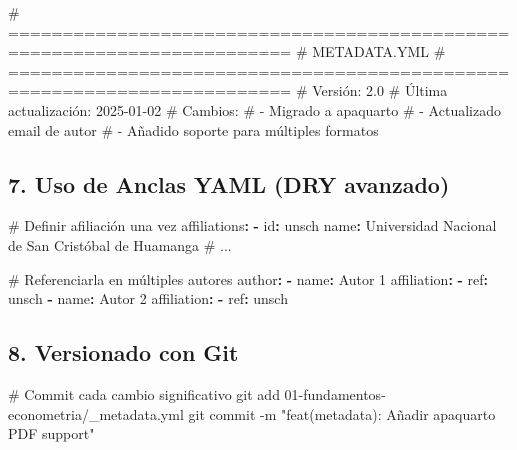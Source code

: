\documentclass[
  doc,
  floatsintext,
  longtable,
  a4paper,
  nolmodern,
  notxfonts,
  notimes,
  12pt,
  colorlinks=true,linkcolor=blue,citecolor=blue,urlcolor=blue]{apa7}
\newenvironment{Shaded}{\begin{snugshade}}{\end{snugshade}}
\newcommand{\AttributeTok}[1]{\textcolor[rgb]{0.40,0.45,0.13}{#1}}
\newcommand{\CommentTok}[1]{\textcolor[rgb]{0.37,0.37,0.37}{#1}}
\newcommand{\FunctionTok}[1]{\textcolor[rgb]{0.28,0.35,0.67}{#1}}
\newcommand{\KeywordTok}[1]{\textcolor[rgb]{0.00,0.23,0.31}{\textbf{#1}}}
\newcommand{\NormalTok}[1]{\textcolor[rgb]{0.00,0.23,0.31}{#1}}
\newcommand{\StringTok}[1]{\textcolor[rgb]{0.13,0.47,0.30}{#1}}
\begin{document}
\begin{Shaded}
\begin{Highlighting}[]
\CommentTok{\# ========================================================================}
\CommentTok{\# METADATA.YML}
\CommentTok{\# ========================================================================}
\CommentTok{\# Versión: 2.0}
\CommentTok{\# Última actualización: 2025{-}01{-}02}
\CommentTok{\# Cambios:}
\CommentTok{\#   {-} Migrado a apaquarto}
\CommentTok{\#   {-} Actualizado email de autor}
\CommentTok{\#   {-} Añadido soporte para múltiples formatos}
\end{Highlighting}
\end{Shaded}

\subsection{7. Uso de Anclas YAML (DRY
avanzado)}\label{uso-de-anclas-yaml-dry-avanzado}

\begin{Shaded}
\begin{Highlighting}[]
\CommentTok{\# Definir afiliación una vez}
\FunctionTok{affiliations}\KeywordTok{:}
\AttributeTok{  }\KeywordTok{{-}}\AttributeTok{ }\FunctionTok{id}\KeywordTok{:}\AttributeTok{ unsch}
\AttributeTok{    }\FunctionTok{name}\KeywordTok{:}\AttributeTok{ Universidad Nacional de San Cristóbal de Huamanga}
\CommentTok{    \# ...}

\CommentTok{\# Referenciarla en múltiples autores}
\FunctionTok{author}\KeywordTok{:}
\AttributeTok{  }\KeywordTok{{-}}\AttributeTok{ }\FunctionTok{name}\KeywordTok{:}\AttributeTok{ Autor 1}
\AttributeTok{    }\FunctionTok{affiliation}\KeywordTok{:}
\AttributeTok{      }\KeywordTok{{-}}\AttributeTok{ }\FunctionTok{ref}\KeywordTok{:}\AttributeTok{ unsch}
\AttributeTok{  }\KeywordTok{{-}}\AttributeTok{ }\FunctionTok{name}\KeywordTok{:}\AttributeTok{ Autor 2}
\AttributeTok{    }\FunctionTok{affiliation}\KeywordTok{:}
\AttributeTok{      }\KeywordTok{{-}}\AttributeTok{ }\FunctionTok{ref}\KeywordTok{:}\AttributeTok{ unsch}
\end{Highlighting}
\end{Shaded}

\subsection{8. Versionado con Git}\label{versionado-con-git}

\begin{Shaded}
\begin{Highlighting}[]
\CommentTok{\# Commit cada cambio significativo}
\FunctionTok{git}\NormalTok{ add 01{-}fundamentos{-}econometria/\_metadata.yml}
\FunctionTok{git}\NormalTok{ commit }\AttributeTok{{-}m} \StringTok{"feat(metadata): Añadir apaquarto PDF support"}
\end{Highlighting}
\end{Shaded}
\end{document}
